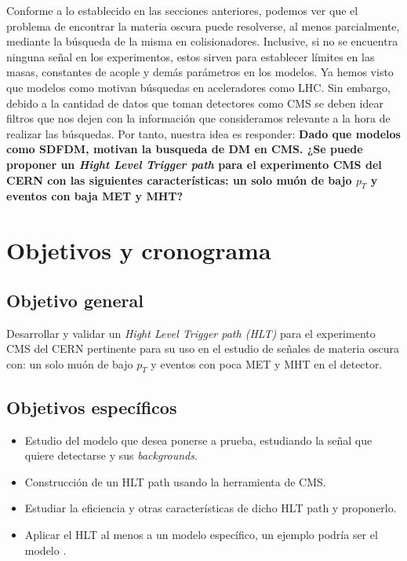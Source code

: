 	Conforme a lo establecido en las secciones anteriores, podemos ver que el problema de encontrar la materia oscura puede resolverse, al menos parcialmente, mediante la búsqueda de la misma en colisionadores. Inclusive, si no se encuentra ninguna señal en los experimentos, estos sirven para establecer límites en las masas, constantes de acople y demás parámetros en los modelos. Ya hemos visto que modelos como \cite{1475-7516-2016-03-048} motivan búsquedas en aceleradores como LHC. Sin embargo, debido a la cantidad de datos que toman detectores como CMS se deben idear filtros que nos dejen con la información que consideramos relevante a la hora de realizar las búsquedas. Por tanto, nuestra idea es responder: \textbf{Dado que modelos como SDFDM, motivan la busqueda de DM en CMS. ¿Se puede proponer un \textit{Hight Level Trigger path} para el experimento CMS del CERN con las siguientes características: un solo muón de bajo $p_T$ y eventos con baja MET y MHT?}


\newpage
\section{Objetivos y cronograma}


\subsection{Objetivo general}

Desarrollar y validar un \textit{Hight Level Trigger path (HLT)} para el experimento CMS del CERN pertinente para su uso en el estudio de señales de materia oscura con: un solo muón de bajo $p_T$ y eventos con poca MET y MHT en el detector.

\subsection{Objetivos específicos}

\begin{itemize}
	\item Estudio del modelo que desea ponerse a prueba, estudiando la señal que quiere detectarse y sus \textit{backgrounds}.
	\item Construcción de un HLT path usando la herramienta de CMS.
	\item Estudiar la eficiencia y otras características de dicho HLT path y proponerlo.
	\item Aplicar el HLT al menos a un modelo específico, un ejemplo podría ser el modelo \cite{1475-7516-2016-03-048}.
\end{itemize}


